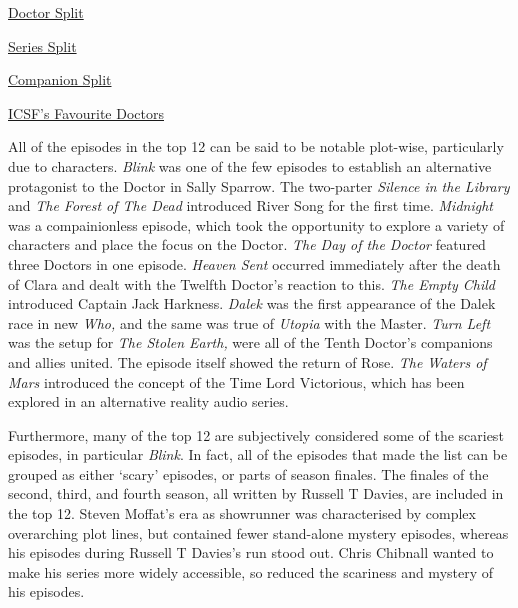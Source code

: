 \vspace{2em}

\begin{center}
\begingroup
\sc
\parbox{0.26\textwidth}{\centering \ul{Doctor Split}}
\parbox{0.32\textwidth}{\centering \ul{Series Split}}
\parbox{0.3\textwidth}{\centering \ul{Companion Split}}
\endgroup




\end{center}

\clearpage

\begin{center}
\begingroup
\ul{\sc ICSF's Favourite Doctors}
\endgroup
\vspace{-1em}

\end{center}

All of the episodes in the top 12 can be said to be notable plot-wise,
particularly due to characters. \emph{Blink} was one of the few episodes to
establish an alternative protagonist to the Doctor in Sally Sparrow. The
two-parter \emph{Silence in the Library} and \emph{The Forest of The Dead}
introduced River Song for the first time. \emph{Midnight} was a compainionless
episode, which took the opportunity to explore a variety of characters and
place the focus on the Doctor. \emph{The Day of the Doctor} featured three Doctors
in one episode. \emph{Heaven Sent} occurred immediately after the death of
Clara and dealt with the Twelfth Doctor's reaction to this. \emph{The Empty
Child} introduced Captain Jack Harkness. \emph{Dalek} was the first
appearance of the Dalek race in new \emph{Who,} and the same was true of
\emph{Utopia} with the Master. \emph{Turn Left} was the setup for \emph{The
Stolen Earth,} were all of the Tenth Doctor's companions and allies united.
The episode itself showed the return of Rose. \emph{The Waters of Mars}
introduced the concept of the Time Lord Victorious, which has been explored in
an alternative reality audio series.

Furthermore, many of the top 12 are subjectively considered some of the
scariest episodes, in particular \emph{Blink}. In fact, all of the episodes
that made the list can be grouped as either `scary' episodes, or parts of season finales.
The finales of the second, third, and fourth season, all written by Russell T
Davies, are included in the top 12. Steven Moffat's era as showrunner was
characterised by complex overarching plot lines, but contained fewer
stand-alone mystery episodes, whereas his episodes during Russell T Davies's
run stood out. Chris Chibnall wanted to make his series more widely
accessible, so reduced the scariness and mystery of his episodes.
